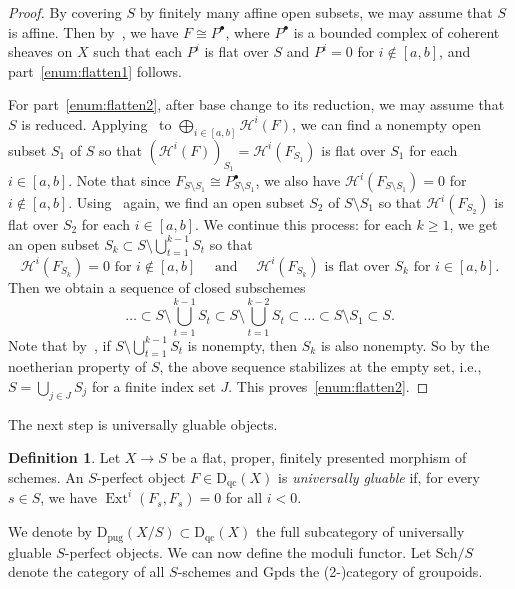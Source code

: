 \documentclass[11pt, reqno]{amsart}
\numberwithin{equation}{section}
\theoremstyle{plain}
\theoremstyle{remark}
\theoremstyle{definition}
\newtheorem{definition}[theorem]{Definition}
\theoremstyle{italicsname}
\newcommand{\Dqc}{\mathrm{D}_{\mathrm{qc}}}
\newcommand{\Dpug}{\mathrm{D_{pug}}}
\DeclareMathOperator{\Ext}{Ext}
\newcommand{\cH}{\mathcal{H}}
\def\citestacks#1{\cite[\href{https://stacks.math.columbia.edu/tag/#1}{#1}]{stacks-project}}
\begin{document}
\begin{proof}
By covering $S$ by finitely many affine open subsets, we may assume that $S$ is affine. 
Then by~\cite[Corollary 2.1.7]{lieblich:moduli-of-complex}, we have $F\cong P^{\bullet}$, where $P^{\bullet}$ is a bounded complex of coherent sheaves on $X$ such that each $P^i$ is flat over $S$ and $P^i=0$ for $i\notin [a,b]$, and part~\ref{enum:flatten1} follows.

For part~\ref{enum:flatten2}, after base change to its reduction, we may assume that $S$ is reduced. 
Applying~\citestacks{052B} to $\bigoplus_{i\in [a,b]} \cH^i(F)$, we can find a nonempty open subset $S_1$ of $S$ so that $(\cH^i(F))_{S_1}=\cH^i(F_{S_1})$ is flat over $S_1$ for each $i\in [a,b]$. 
Note that since $F_{S\setminus S_1}\cong P^{\bullet}_{S\setminus S_1}$, we also have $\cH^i(F_{S\setminus S_1})=0$ for $i\notin [a,b]$. 
Using~\citestacks{052B} again, we find an open subset $S_2$ of $S\setminus S_1$ so that $\cH^i(F_{S_2})$ is flat over $S_2$ for each $i\in [a,b]$. 
We continue this process: for each $k\geq 1$, we get an open subset $S_k\subset S\setminus \bigcup_{t=1}^{k-1} S_t$ so that
\[
\cH^i(F_{S_k})=0 \text{ for } i\notin [a,b] \quad \text{ and } \quad \cH^i(F_{S_k}) \text{ is flat over } S_k \text{ for } i\in [a,b].
\]
Then we obtain a sequence of closed subschemes
\[
\dots \subset S\setminus \bigcup_{t=1}^{k-1} S_t\subset S\setminus \bigcup_{t=1}^{k-2} S_t\subset \dots \subset S\setminus S_1\subset S.
\]
Note that by~\citestacks{052B}, if $S\setminus\bigcup_{t=1}^{k-1} S_t$ is nonempty, then $S_k$ is also nonempty. 
So by the noetherian property of $S$, the above sequence stabilizes at the empty set, i.e., $S=\bigcup_{j\in J} S_j$ for a finite index set $J$. 
This proves~\ref{enum:flatten2}.
\end{proof}

The next step is universally gluable objects.

\begin{definition}
Let $X\to S$ be a flat, proper, finitely presented morphism of schemes. 
An $S$-perfect object $F\in\Dqc(X)$ is \emph{universally gluable} if, for every $s\in S$, we have $\Ext^i(F_s,F_s)=0$ for all $i<0$.
\end{definition}

We denote by $\Dpug(X/S)\subset \Dqc(X)$ the full subcategory of universally gluable $S$-perfect objects.
We can now define the moduli functor.
Let $\mathrm{Sch}/S$ denote the category of all $S$-schemes and $\mathrm{Gpds}$ the (2-)category of groupoids.
\end{document}
